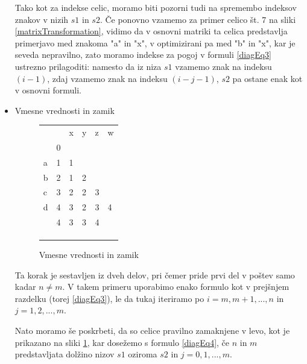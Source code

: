 \documentclass[a4paper,12pt,openright]{book}
\begin{document}
\begin{itemize}
Tako kot za indekse celic, moramo biti pozorni tudi na spremembo indeksov znakov v nizih $s1$ in $s2$. Če ponovno vzamemo za primer celico št. 7 na sliki \ref{matrixTransformation}, vidimo da v osnovni matriki ta celica predstavlja primerjavo med znakoma "a" in "x", v optimizirani pa med "b" in "x", kar je seveda nepravilno, zato moramo indekse za pogoj v formuli \ref{diagEq3} ustrezno prilagoditi: namesto da iz niza $s1$ vzamemo znak na indeksu $(i-1)$, zdaj vzamemo znak na indeksu $(i-j-1)$, $s2$ pa ostane enak kot v osnovni formuli. 

    \item Vmesne vrednosti in zamik
    
\begin{figure}[htb]
\centering
\begin{tabular}{|l|l|l|l|l|l|}
\cline{3-6}
\multicolumn{2}{c|}{} & x & y & z & w \\ \cline{2-6}
\multicolumn{1}{c|}{} & 0 & \multicolumn{4}{c}{} \\ \cline{1-3}
a  & 1 & 1 & \multicolumn{3}{c}{} \\ \cline{1-4}
b  & 2 & 1 & 2 & \multicolumn{2}{c}{} \\ \cline{1-5}
c  & 3 & 2 & 2 & 3 & \multicolumn{1}{c}{} \\ \cline{1-6}
d  & 4 & 3 & 2 & 3 & 4 \\ \hline
 \multicolumn{1}{c|}{} & \cellcolor{blue!15}4 & \cellcolor{blue!15}3 & \cellcolor{blue!15}3 & \cellcolor{blue!15}4 & \multicolumn{1}{c}{} \\ \cline{2-5}
\multicolumn{1}{c|}{} & & & & \multicolumn{2}{c}{} \\ \cline{2-4}
\multicolumn{1}{c|}{} & & & \multicolumn{3}{c}{} \\ \cline{2-3}
\multicolumn{1}{c|}{} & & \multicolumn{4}{c}{} \\ \cline{2-2}
\end{tabular}
\caption{Vmesne vrednosti in zamik}
\label{diagMemory3}
\end{figure}

Ta korak je sestavljen iz dveh delov, pri čemer pride prvi del v poštev samo kadar $n \neq m$. V takem primeru uporabimo enako formulo kot v prejšnjem razdelku (torej \ref{diagEq3}), le da tukaj iteriramo po $i=m,m+1,...,n$ in $j=1,2,...,m$. 

Nato moramo še poskrbeti, da so celice pravilno zamaknjene v levo, kot je prikazano na sliki \ref{diagMemory3}, kar dosežemo s formulo \ref{diagEq4}, če $n$ in $m$ predstavljata dolžino nizov $s1$ oziroma $s2$ in $j=0,1,...,m$.


\end{itemize}
\end{document}

